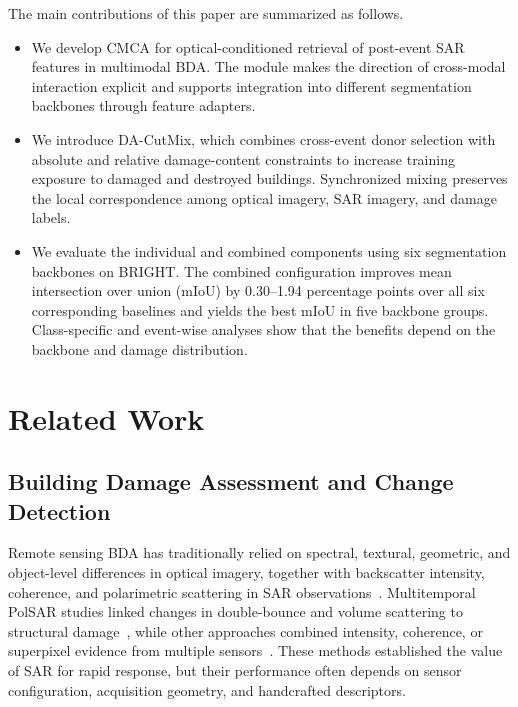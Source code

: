 \documentclass[journal]{IEEEtran}
\newcommand{\cmca}{CMCA}
\newcommand{\dacutmix}{DA-CutMix}
\begin{document}
    The main contributions of this paper are summarized as follows.
    \begin{itemize}
        \item We develop CMCA for optical-conditioned retrieval of post-event SAR features in multimodal BDA. The module makes the direction of cross-modal interaction explicit and supports integration into different segmentation backbones through feature adapters.
        \item We introduce DA-CutMix, which combines cross-event donor selection with absolute and relative damage-content constraints to increase training exposure to damaged and destroyed buildings. Synchronized mixing preserves the local correspondence among optical imagery, SAR imagery, and damage labels.
        \item We evaluate the individual and combined components using six segmentation backbones on BRIGHT. The combined configuration improves mean intersection over union (mIoU) by 0.30–1.94 percentage points over all six corresponding baselines and yields the best mIoU in five backbone groups. Class-specific and event-wise analyses show that the benefits depend on the backbone and damage distribution.
    \end{itemize}
    
    
    \section{Related Work}
    \label{sec:related_work}
    
    
    \subsection{Building Damage Assessment and Change Detection}
    
    Remote sensing BDA has traditionally relied on spectral, textural, geometric, and object-level differences in optical imagery, together with backscatter intensity, coherence, and polarimetric scattering in SAR observations~\cite{dong2013review,plank2014rapid,ge2020sarreview}. Multitemporal PolSAR studies linked changes in double-bounce and volume scattering to structural damage~\cite{chen2013tsunami,chen2016polsar}, while other approaches combined intensity, coherence, or superpixel evidence from multiple sensors~\cite{karimzadeh2017multisensor,jiang2020belief}. These methods established the value of SAR for rapid response, but their performance often depends on sensor configuration, acquisition geometry, and handcrafted descriptors.
    
\end{document}
